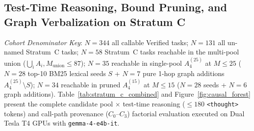 \documentclass[10pt]{article}
\begin{document}
\subsection{Test-Time Reasoning, Bound Pruning, and Graph Verbalization on Stratum C}
\label{sec:stratum_c_reasoning}
\noindent\textit{Cohort Denominator Key}: $N=344$ all callable Verified tasks; $N=131$ all un-named Stratum~C tasks; $N=58$ Stratum~C tasks reachable in the multi-pool union ($\bigcup_i A_i, M_{\text{union}} \le 87$); $N=35$ reachable in single-pool $A_4^{(25)}$ at $M \le 25$ ($N=28$ top-10 BM25 lexical seeds $S$ + $N=7$ pure 1-hop graph additions $A_4^{(25)} \setminus S$); $N=34$ reachable in pruned $A_4^{(15)}$ at $M \le 15$ ($N=28$ seeds + $N=6$ graph additions). Table~\ref{tab:stratum_c_combined} and Figure~\ref{fig:causal_forest} present the complete candidate pool $\times$ test-time reasoning ($\le 180$ \texttt{<thought>} tokens) and call-path provenance ($C_0\text{--}C_3$) factorial evaluation executed on Dual Tesla T4 GPUs with \texttt{gemma-4-e4b-it}.
\end{document}
